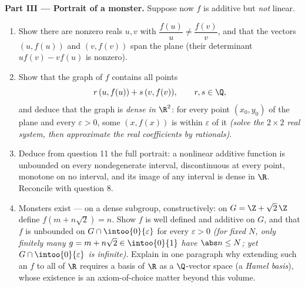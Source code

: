\begin{problem}[{Weekend problem --- $f(x + y) = f(x) + f(y)$:
regularity forces linearity, and the portrait of the monsters}]
\medskip
\noindent\textbf{Part III --- Portrait of a monster.} Suppose
now $f$ is additive but \emph{not} linear.
\begin{enumerate}[resume]
  \item Show there are nonzero reals $u, v$ with
        $\dfrac{f(u)}{u} \neq \dfrac{f(v)}{v}$, and that the
        vectors $(u, f(u))$ and $(v, f(v))$ span the plane (their
        determinant $u f(v) - v f(u)$ is nonzero).
  \item Show that the graph of $f$ contains all points
        \[
        r\,(u, f(u)) + s\,(v, f(v)), \qquad r, s \in \Q ,
        \]
        and deduce that the graph is \emph{dense in $\R^2$}: for
        every point $(x_0, y_0)$ of the plane and every
        $\varepsilon > 0$, some $(x, f(x))$ is within
        $\varepsilon$ of it \emph{(solve the $2\times2$ real
        system, then approximate the real coefficients by
        rationals)}.
  \item Deduce from question 11 the full portrait: a nonlinear
        additive function is unbounded on every nondegenerate
        interval, discontinuous at every point, monotone on no
        interval, and its image of any interval is dense in
        $\R$. Reconcile with question 8.
  \item Monsters exist --- on a dense subgroup, constructively:
        on $G = \Z + \sqrt2\,\Z$ define $f(m + n\sqrt2) = n$.
        Show $f$ is well defined and additive on $G$, and that
        $f$ is unbounded on $G \cap \intoo{0}{\varepsilon}$ for
        every $\varepsilon > 0$ \emph{(for fixed $N$, only
        finitely many $g = m + n\sqrt2 \in \intoo{0}{1}$ have
        $\abs n \leq N$; yet $G \cap \intoo{0}{\varepsilon}$ is
        infinite)}. Explain in one paragraph why extending such
        an $f$ to all of $\R$ requires a basis of $\R$ as a
        $\Q$-vector space (a \emph{Hamel basis}), whose
        existence is an axiom-of-choice matter beyond this
        volume.
\end{enumerate}


\end{problem}

